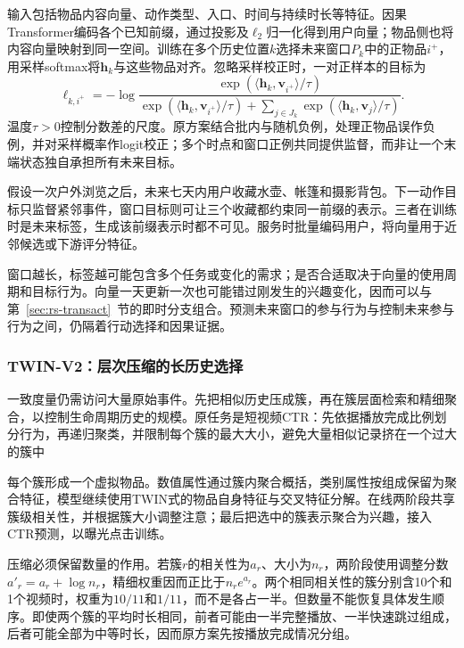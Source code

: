 输入包括物品内容向量、动作类型、入口、时间与持续时长等特征。因果Transformer编码各个已知前缀，通过投影及$\ell_2$归一化得到用户向量；物品侧也将内容向量映射到同一空间。训练在多个历史位置$k$选择未来窗口$P_k$中的正物品$i^+$，用采样softmax将$\bm{h}_k$与这些物品对齐。忽略采样校正时，一对正样本的目标为
\begin{equation}
  \ell_{k,i^+}=-\log
  \frac{\exp(\langle\bm{h}_k,\bm{v}_{i^+}\rangle/\tau)}
  {\exp(\langle\bm{h}_k,\bm{v}_{i^+}\rangle/\tau)
    +\sum_{j\in J_k}\exp(\langle\bm{h}_k,\bm{v}_j\rangle/\tau)}.
  \label{eq:rs-pinnerformer-loss}
\end{equation}
温度$\tau>0$控制分数差的尺度。原方案结合批内与随机负例，处理正物品误作负例，并对采样概率作logit校正；多个时点和窗口正例共同提供监督，而非让一个末端状态独自承担所有未来目标。

假设一次户外浏览之后，未来七天内用户收藏水壶、帐篷和摄影背包。下一动作目标只监督紧邻事件，窗口目标则可让三个收藏都约束同一前缀的表示。三者在训练时是未来标签，生成该前缀表示时都不可见。服务时批量编码用户，将向量用于近邻候选或下游评分特征。

窗口越长，标签越可能包含多个任务或变化的需求；是否合适取决于向量的使用周期和目标行为。向量一天更新一次也可能错过刚发生的兴趣变化，因而可以与第~\ref{sec:rs-transact}~节的即时分支组合。预测未来窗口的参与行为与控制未来参与行为之间，仍隔着行动选择和因果证据。

\subsubsection{TWIN-V2：层次压缩的长历史选择}
\label{sec:rs-twin-v2}

一致度量仍需访问大量原始事件。先把相似历史压成簇，再在簇层面检索和精细聚合，以控制生命周期历史的规模。原任务是短视频CTR：先依据播放完成比例划分行为，再递归聚类，并限制每个簇的最大大小，避免大量相似记录挤在一个过大的簇中

每个簇形成一个虚拟物品。数值属性通过簇内聚合概括，类别属性按组成保留为聚合特征，模型继续使用TWIN式的物品自身特征与交叉特征分解。在线两阶段共享簇级相关性，并根据簇大小调整注意；最后把选中的簇表示聚合为兴趣，接入CTR预测，以曝光点击训练。

压缩必须保留数量的作用。若簇$r$的相关性为$a_r$、大小为$n_r$，两阶段使用调整分数$a'_r=a_r+\log n_r$，精细权重因而正比于$n_r e^{a_r}$。两个相同相关性的簇分别含10个和1个视频时，权重为$10/11$和$1/11$，而不是各占一半。但数量不能恢复具体发生顺序。即使两个簇的平均时长相同，前者可能由一半完整播放、一半快速跳过组成，后者可能全部为中等时长，因而原方案先按播放完成情况分组。

